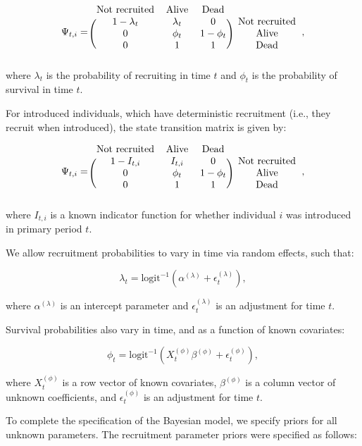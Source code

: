 \documentclass[
  letterpaper,
  DIV=11,
  numbers=noendperiod]{scrartcl}
\begin{document}
\[
\Psi_{t, i} =
\begin{blockarray}{cccc}
  \text{Not recruited} & \text{Alive} & \text{Dead} \\
\begin{block}{(ccc)c}
  1 - \lambda_t & \lambda_t & 0 & \text{Not recruited} \\
  0 & \phi_t & 1 - \phi_t & \text{Alive} \\
  0 & 1 & 1 & \text{Dead} \\
\end{block}
\end{blockarray},
\] where \(\lambda_t\) is the probability of recruiting in time \(t\)
and \(\phi_t\) is the probability of survival in time \(t\).

For introduced individuals, which have deterministic recruitment (i.e.,
they recruit when introduced), the state transition matrix is given by:

\[
\Psi_{t, i} =
\begin{blockarray}{cccc}
  \text{Not recruited} & \text{Alive} & \text{Dead} \\
\begin{block}{(ccc)c}
  1 - I_{t, i} & I_{t, i} & 0 & \text{Not recruited} \\
  0 & \phi_t & 1 - \phi_t & \text{Alive} \\
  0 & 1 & 1 & \text{Dead} \\
\end{block}
\end{blockarray},
\] where \(I_{t, i}\) is a known indicator function for whether
individual \(i\) was introduced in primary period \(t\).

We allow recruitment probabilities to vary in time via random effects,
such that:

\[\lambda_t = \text{logit}^{-1}(\alpha^{(\lambda)} + \epsilon^{(\lambda)}_t),\]

where \(\alpha^{(\lambda)}\) is an intercept parameter and
\(\epsilon^{(\lambda)}_t\) is an adjustment for time \(t\).

Survival probabilities also vary in time, and as a function of known
covariates:

\[\phi_t = \text{logit}^{-1}(X^{(\phi)}_t \beta^{(\phi)} + \epsilon^{(\phi)}_t),\]

where \(X^{(\phi)}_t\) is a row vector of known covariates,
\(\beta^{(\phi)}\) is a column vector of unknown coefficients, and
\(\epsilon^{(\phi)}_t\) is an adjustment for time \(t\).

To complete the specification of the Bayesian model, we specify priors
for all unknown parameters. The recruitment parameter priors were
specified as follows:
\end{document}
